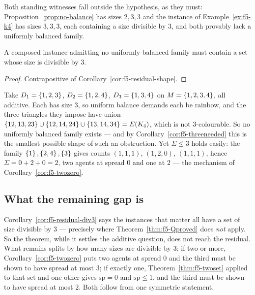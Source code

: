 Both standing witnesses fall outside the hypothesis, as they must:
Proposition~\ref{prop:no-balance} has sizes $2,3,3$ and the instance of
Example~\ref{ex:f5-k4} has sizes $3,3,3$, each containing a size divisible by
$3$, and both provably lack a uniformly balanced family.

\begin{corollary}
\label{cor:f5-residual-div3}
A composed instance admitting no uniformly balanced family must contain a set
whose size is divisible by $3$.
\end{corollary}

\begin{proof}
Contrapositive of Corollary~\ref{cor:f5-residual-shape}.
\end{proof}

\begin{example}
\label{ex:f5-k4}
Take $D_1 = \left\{1,2,3\right\}$, $D_2 = \left\{1,2,4\right\}$, $D_3 = \left\{1,3,4\right\}$ on
$M = \left\{1,2,3,4\right\}$, all additive. Each has size $3$, so uniform balance
demands each be rainbow, and the three triangles they impose have union
$\left\{12,13,23\right\} \cup \left\{12,14,24\right\} \cup \left\{13,14,34\right\} = E(K_4)$, which is not
$3$-colourable. So no uniformly balanced family exists --- and by
Corollary~\ref{cor:f5-threeneeded} this is the smallest possible shape of such an
obstruction. Yet $\Sigma \le 3$ holds easily: the family
$\left\{1\right\},\left\{2,4\right\},\left\{3\right\}$ gives counts $(1,1,1)$, $(1,2,0)$, $(1,1,1)$, hence
$\Sigma = 0 + 2 + 0 = 2$, two agents at spread $0$ and one at $2$ --- the
mechanism of Corollary~\ref{cor:f5-twozero}.
\end{example}

\subsection{What the remaining gap is}
\label{sec:f5-gap}

Corollary~\ref{cor:f5-residual-div3} says the instances that matter all have a
set of size divisible by $3$ --- precisely where
Theorem~\ref{thm:f5-Qproved} does \emph{not} apply. So the theorem, while it
settles the additive question, does not reach the residual. What remains splits
by how many sizes are divisible by $3$: if two or more,
Corollary~\ref{cor:f5-twozero} puts two agents at spread $0$ and the third must
be shown to have spread at most $3$; if exactly one,
Theorem~\ref{thm:f5-twoset} applied to that set and one other gives
$\mathrm{sp} = 0$ and $\mathrm{sp} \le 1$, and the third must be shown to have
spread at most $2$. Both follow from one symmetric statement.

